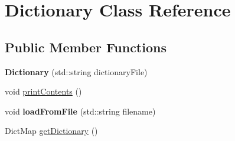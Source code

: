 \hypertarget{classDictionary}{
\section{Dictionary Class Reference}
\label{classDictionary}
}
\subsection*{Public Member Functions}
\begin{DoxyCompactItemize}
\item 
\hypertarget{classDictionary_a3607b27bd51b778d6fee817fdf19d6bf}{
{\bfseries Dictionary} (std::string dictionaryFile)}
\label{classDictionary_a3607b27bd51b778d6fee817fdf19d6bf}

\item 
void \hyperlink{classDictionary_a2dbee36571908c93d96cfe885f25272e}{printContents} ()
\item 
\hypertarget{classDictionary_afeca5aa092a92aec62224e720e2304d2}{
void {\bfseries loadFromFile} (std::string filename)}
\label{classDictionary_afeca5aa092a92aec62224e720e2304d2}

\item 
DictMap \hyperlink{classDictionary_a9696c9da75da8f8bfd1a1e2ff071c343}{getDictionary} ()
\end{DoxyCompactItemize}


